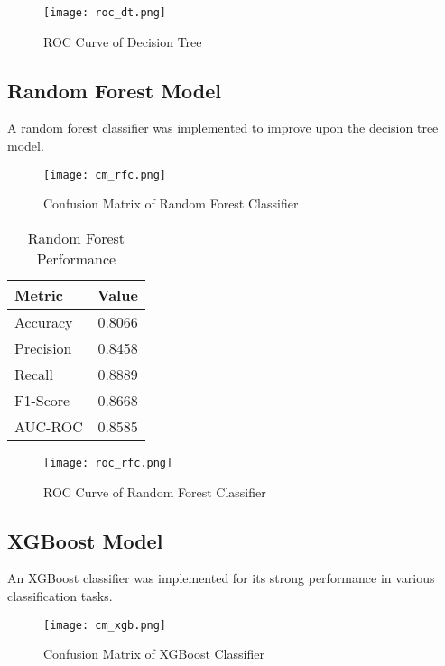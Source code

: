 \documentclass[12pt]{article}
\begin{document}
\begin{figure}[H]
    \centering
    \texttt{[image: roc\_dt.png]}
    \caption{ROC Curve of Decision Tree}
    \label{fig:example}
\end{figure}



\subsection{Random Forest Model}
A random forest classifier was implemented to improve upon the decision tree model.

\begin{figure}[H]
    \centering
    \texttt{[image: cm\_rfc.png]}
    \caption{Confusion Matrix of Random Forest Classifier}
    \label{fig:example}
\end{figure}


\begin{table}[H]
\centering
\caption{Random Forest Performance}
\label{tab:rf_perf}
\begin{tabular}{lr}
\toprule
\textbf{Metric} & \textbf{Value} \\
\midrule
Accuracy & 0.8066 \\
Precision & 0.8458 \\
Recall & 0.8889 \\
F1-Score & 0.8668 \\
AUC-ROC & 0.8585 \\
\bottomrule
\end{tabular}
\end{table}

\begin{figure}[H]
    \centering
    \texttt{[image: roc\_rfc.png]}
    \caption{ROC Curve of Random Forest Classifier}
    \label{fig:example}
\end{figure}


\subsection{XGBoost Model}
An XGBoost classifier was implemented for its strong performance in various classification tasks.

\begin{figure}[H]
    \centering
    \texttt{[image: cm\_xgb.png]}
    \caption{Confusion Matrix of XGBoost Classifier}
    \label{fig:example}
\end{figure}
\end{document}
